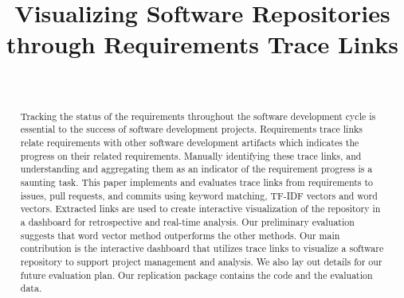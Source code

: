 \documentclass[conference]{IEEEtran}
\begin{document}
\title{Visualizing Software Repositories through Requirements Trace Links}

\author{
  \\
}


\maketitle
\begin{abstract}
  Tracking the status of the requirements throughout the software development cycle is essential to the success of software development projects.
  Requirements trace links relate requirements with other software development artifacts which indicates the progress on their related requirements. Manually identifying these trace links, and  understanding and aggregating them as an indicator of the requirement progress is a saunting task.
  This paper implements and evaluates trace links from requirements to issues, pull requests, and commits using keyword matching, TF-IDF vectors and word vectors. Extracted links are used to create interactive visualization of the repository in a dashboard for retrospective and real-time analysis.
  Our preliminary evaluation suggests that word vector method outperforms the other methods.
  Our main contribution is the interactive dashboard that utilizes trace links to visualize a software repository to support project management and analysis. We also lay out details for our future evaluation plan. Our replication package contains the code and the evaluation data.

\end{abstract}
\end{document}
